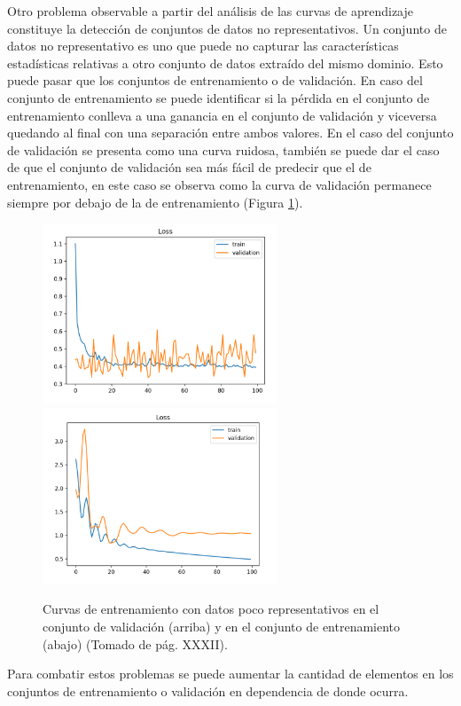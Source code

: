 \documentclass[a4paper,11pt,twocolumn,twoside]{article}
\begin{document}
Otro problema observable a partir del análisis de las curvas de aprendizaje constituye la detección de conjuntos
de datos no representativos. Un conjunto de datos no representativo es uno que puede no 
capturar las características estadísticas relativas a otro conjunto de datos extraído del mismo dominio.
Esto puede pasar que los conjuntos de entrenamiento o de validación. En caso del conjunto de entrenamiento
se puede identificar si la pérdida en el conjunto de entrenamiento conlleva a una ganancia en el conjunto de 
validación y viceversa quedando al final con una separación entre ambos valores. En el caso del conjunto de 
validación se presenta como una curva ruidosa, también se puede dar el caso de que el conjunto  de validación
sea más fácil de predecir que el de entrenamiento, en este caso se observa como la curva de validación permanece
siempre por debajo de la de entrenamiento (Figura \ref{fig:unrepresentative_data}).

\begin{figure}[h]
	\centering
	\includegraphics[width=7cm,clip]{Graphics/unrepresentative_dev_set.png}
	\includegraphics[width=7cm,clip]{Graphics/unrepresentative_train_set.png}
	\caption{Curvas de entrenamiento con datos poco representativos en el conjunto de validación (arriba)
		y en el conjunto de entrenamiento (abajo) (Tomado de \cite{brownlee2018better} pág. XXXII).}
	\label{fig:unrepresentative_data}
\end{figure}

Para combatir estos problemas se puede aumentar la cantidad de elementos en los conjuntos de entrenamiento o 
validación en dependencia de donde ocurra.
\end{document}
